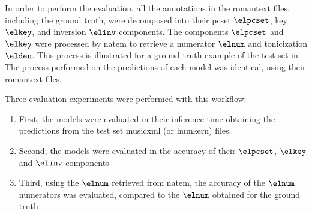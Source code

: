 
In order to perform the evaluation, all the annotations in
the \gls{romantext} files, including the ground truth, were
decomposed into their \gls{pcset} $\elpcset$, key $\elkey$,
and inversion $\elinv$ components. The components $\elpcset$
and $\elkey$ were processed by \gls{natem} to retrieve a
numerator $\elnum$ and tonicization $\elden$. This process
is illustrated for a ground-truth example of the test set in
. The process performed on the
predictions of each model was identical, using their
\gls{romantext} files.

Three evaluation experiments were performed with this
workflow:
\begin{enumerate}
    \item First, the models were evaluated in their
    inference time obtaining the predictions from the test
    set \gls{musicxml} (or \gls{humkern}) files.
    \item Second, the models were evaluated in the accuracy
    of their $\elpcset$, $\elkey$ and $\elinv$ components
    \item Third, using the $\elnum$ retrieved from
    \gls{natem}, the accuracy of the $\elnum$ numerators was
    evaluated, compared to the $\elnum$ obtained for the
    ground truth
\end{enumerate}




